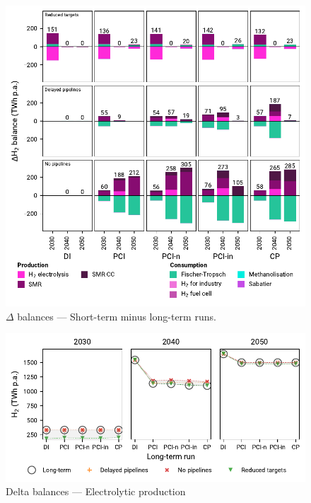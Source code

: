 \documentclass[final,5p,times,twocolumn,sort&compress]{elsarticle}
\begin{document}
\begin{figure}[htbp]
  \centering
  \includegraphics[width=\linewidth]{balances_overview_extended_H2}
  \caption{$\Delta$ balances --- Short-term minus long-term runs.}
  \label{fig:balances_overview_extended_H2_stored}
\end{figure}

\begin{figure}[htbp]
  \centering
  \includegraphics[width=\linewidth]{delta_balances_H2 Electrolysis}
  \caption{Delta balances --- Electrolytic  production}
  \label{fig:delta_balances_h2_electrolysis}
\end{figure}
\end{document}
